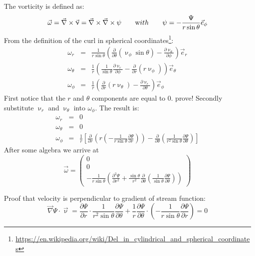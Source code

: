 The vorticity is defined as:
\[
\vec\omega = \vec\nabla \times \vec\upnu = \vec\nabla\times\vec\nabla\times \psi
\qquad
{\text with}
\qquad
\psi = -\frac{\Psi}{r \sin \theta} \vec{e}_\phi
\]
From the definition of the curl in spherical coordinates\footnote{\url{https://en.wikipedia.org/wiki/Del_in_cylindrical_and_spherical_coordinates}}:
\begin{eqnarray}
\omega_r &=& \frac{1}{r \sin\theta} \left( \frac{\partial}{\partial \theta}
(\upnu_\phi \sin\theta) - \frac{\partial \upnu_\theta}{\partial \phi}\right) \vec{e}_r \\
\omega_\theta &=& \frac{1}{r} \left( \frac{1}{\sin\theta} 
\frac{\partial \upnu_r}{\partial \phi} - \frac{\partial}{\partial r}
(r \upnu_\phi)  \right) \vec{e}_\theta \\
\omega_\phi &=& \frac{1}{r} \left( 
\frac{\partial}{\partial r} (r \upnu_\theta) - \frac{\partial \upnu_r}{\partial \theta}\right) \vec{e}_\phi 
\end{eqnarray}
First notice that the $r$ and $\theta$ components are equal to $0$. {\color{orange} prove!}
Secondly substitute $\upnu_r$ and $\upnu_\theta$ into $\omega_\phi$.
The result is:
\begin{eqnarray}
\omega_r &=& 0 \\
\omega_\theta &=& 0 \\
\omega_\phi &=& \frac{1}{r}
\left[
\frac{\partial }{\partial r} \left(r \left( -\frac{1}{r \sin \theta} \frac{\partial \Psi}{\partial r}
\right)\right) - \frac{\partial}{\partial \theta} \left( \frac{1}{r^2 \sin\theta} \frac{\partial \Psi}{\partial \theta}  \right)
\right]
\end{eqnarray}
After some algebra we arrive at
\[
\vec\omega
= 
\left(
\begin{array}{c}
0 \\ 0 \\
-\frac{1}{r \sin\theta} \left(  \frac{\partial^2 \Psi}{\partial r^2} 
+ \frac{\sin\theta}{r^2} \frac{\partial}{\partial \theta}
\left(
\frac{1}{\sin \theta} \frac{\partial \Psi}{\partial \theta}
\right)
\right)
\end{array}
\right)
\]

Proof that velocity is perpendicular to gradient of stream function:
\[
\vec\nabla \Psi \cdot \vec\upnu 
= \frac{\partial \Psi}{\partial r} \cdot \frac{1}{r^2 \sin\theta} \frac{\partial \Psi}{\partial \theta}
+ \frac{1}{r} \frac{\partial \Psi}{\partial \theta} \cdot
\left( 
-\frac{1}{r \sin\theta} \frac{\partial \Psi}{\partial r}
\right) 
=0
\]


